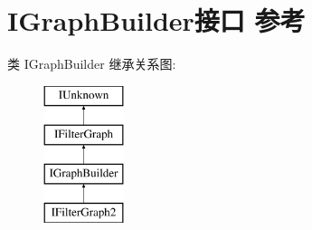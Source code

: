 \hypertarget{interface_i_graph_builder}{}\section{I\+Graph\+Builder接口 参考}
\label{interface_i_graph_builder}
类 I\+Graph\+Builder 继承关系图\+:\begin{figure}[H]
\begin{center}
\leavevmode
\includegraphics[height=4.000000cm]{interface_i_graph_builder}
\end{center}
\end{figure}
